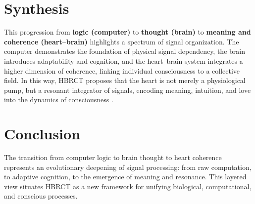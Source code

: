 \documentclass[12pt]{article}
\begin{document}
\section*{Synthesis}
This progression from \textbf{logic (computer)} to \textbf{thought (brain)} to \textbf{meaning and coherence (heart--brain)} highlights a spectrum of signal organization.
The computer demonstrates the foundation of physical signal dependency,
the brain introduces adaptability and cognition,
and the heart--brain system integrates a higher dimension of coherence,
linking individual consciousness to a collective field.
In this way, HBRCT proposes that the heart is not merely a physiological pump,
but a resonant integrator of signals, encoding meaning, intuition, and love into the dynamics of consciousness \cite{mcCraty2015science, childre2016heartintelligence}.

\section*{Conclusion}
The transition from computer logic to brain thought to heart coherence represents an evolutionary deepening of signal processing: from raw computation, to adaptive cognition, to the emergence of meaning and resonance.
This layered view situates HBRCT as a new framework for unifying biological, computational, and conscious processes.

\nocite{*}


\end{document}
